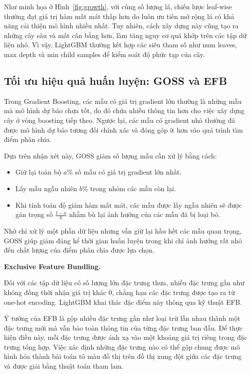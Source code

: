 \documentclass[a4paper]{report}
\newcommand{\code}[1]{{\ttfamily\def\_{\textunderscore\discretionary{}{}{}}#1}}
\def\code#1{#1}%
\def\_{ }%
\begin{document}
Như minh họa ở Hình~\ref{fig:growth}, với cùng số lượng lá, chiến lược
leaf-wise thường đạt giá trị hàm mất mát thấp hơn do luôn ưu tiên mở rộng lá có
khả năng cải thiện mô hình nhiều nhất. Tuy nhiên, cách xây dựng này cũng tạo ra
những cây sâu và mất cân bằng hơn, làm tăng nguy cơ quá khớp trên các tập dữ
liệu nhỏ. Vì vậy, LightGBM thường kết hợp các siêu tham số như
\code{num\_leaves}, \code{max\_depth} và \code{min\_child\_samples} để kiểm
soát độ phức tạp của cây.

\subsection{Tối ưu hiệu quả huấn luyện: GOSS và EFB}

Trong Gradient Boosting, các mẫu có giá trị gradient lớn thường là những mẫu
mà mô hình dự báo chưa tốt, do đó chứa nhiều thông tin hơn cho việc xây dựng
cây ở vòng boosting tiếp theo. Ngược lại, các mẫu có gradient nhỏ thường đã
được mô hình dự báo tương đối chính xác và đóng góp ít hơn vào quá trình tìm
điểm phân chia.

Dựa trên nhận xét này, GOSS giảm số lượng
mẫu cần xử lý bằng cách:

\begin{itemize}[leftmargin=*]
  \item Giữ lại toàn bộ $a\%$ số mẫu có giá trị gradient lớn nhất.
  \item Lấy mẫu ngẫu nhiên $b\%$ trong nhóm các mẫu còn lại.
  \item Khi tính toán độ giảm hàm mất mát, các mẫu được lấy ngẫu nhiên sẽ được
        gán trọng số $\frac{1-a}{b}$ nhằm bù lại ảnh hưởng của các mẫu đã bị
        loại bỏ.
\end{itemize}

Nhờ chỉ xử lý một phần dữ liệu nhưng vẫn giữ lại hầu hết các mẫu quan trọng,
GOSS giúp giảm đáng kể thời gian huấn luyện trong khi chỉ ảnh hưởng rất nhỏ đến
chất lượng của điểm phân chia được lựa chọn.

\medskip
\noindent\textbf{Exclusive Feature Bundling.}

Đối với các tập dữ liệu có số lượng lớn đặc trưng thưa,
nhiều đặc trưng gần như không đồng thời nhận giá trị khác 0, chẳng hạn các đặc
trưng được tạo ra từ one-hot encoding. LightGBM khai thác đặc điểm này thông
qua kỹ thuật EFB.

Ý tưởng của EFB là gộp nhiều đặc trưng gần như loại trừ lẫn nhau thành một đặc
trưng mới mà vẫn bảo toàn thông tin của từng đặc trưng ban đầu. Để thực hiện
điều này, mỗi đặc trưng được ánh xạ vào một khoảng giá trị riêng trong đặc
trưng tổng hợp. Việc xác định những đặc trưng nào có thể gộp chung được mô hình
hóa thành bài toán tô màu đồ thị trên đồ thị xung đột giữa các
đặc trưng và được giải bằng thuật toán tham lam.
\end{document}
